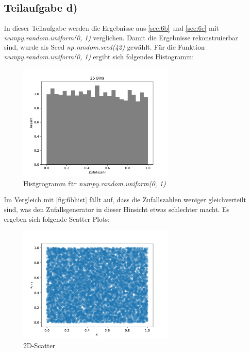 \subsection{Teilaufgabe d)}
In dieser Teilaufgabe werden die Ergebnisse aus \ref{sec:6b} und \ref{sec:6c} mit \textit{numpy.random.uniform(0, 1)} verglichen.
Damit die Ergebnisse rekonstruierbar sind, wurde als Seed \textit{np.random.seed(42)} gewählt.
Für die Funktion \textit{numpy.random.uniform(0, 1)} ergibt sich folgendes Histogramm:
\begin{figure}[H]
  \centering
  \includegraphics[width=0.7\textwidth]{Aufgabe06/Teilaufgabe_d)_Histogramm.pdf}
  \caption{Histgrogramm für \textit{numpy.random.uniform(0, 1)}}
  \label{6dhist}
\end{figure}
Im Vergleich mit \ref{fig:6bhist} fällt auf, dass die Zufallszahlen weniger gleichverteilt sind, was den Zufallsgenerator in dieser Hinsicht etwas schlechter macht.
Es ergeben sich folgende Scatter-Plots:
\begin{figure}[H]
  \centering
  \includegraphics[width=0.7\textwidth]{Aufgabe06/Teilaufgabe_d)_2D-Scatter.pdf}
  \caption{2D-Scatter}
  \label{fig:2dscatterc}
\end{figure}

